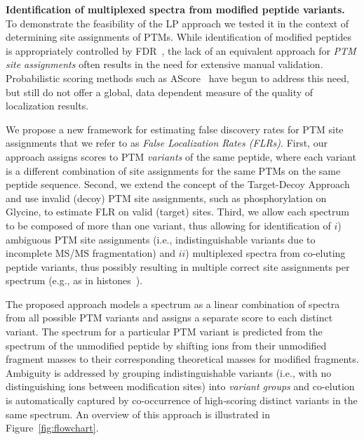 \documentclass[arial,11pt]{article}
\begin{document}
{\bf Identification of multiplexed spectra from modified peptide variants.} To demonstrate the feasibility of the LP approach we tested it in the context of determining site assignments of PTMs. While identification of modified peptides is appropriately controlled by FDR~\cite{beausoleil04,Trinidad2012}, the lack of an equivalent approach for {\em PTM site assignments} often results in the need for extensive manual validation. Probabilistic scoring methods such as AScore~\cite{beausoleil06} have begun to address this need, but still do not offer a global, data dependent measure of the quality of localization results. %

We propose a new framework for estimating  false discovery rates for PTM site assignments that we refer to as  {\em False Localization Rates (FLRs)}.   First, our approach assigns scores to PTM {\em variants} of the same peptide, where each variant is a different combination of site assignments for the same PTMs on the same peptide sequence. Second, we extend the concept of the Target-Decoy Approach~\cite{Elias2007}
and use invalid (decoy) PTM site assignments, such as phosphorylation on Glycine, to estimate FLR on valid (target) sites. Third, we allow each spectrum to be composed of more than one variant, thus allowing for identification of  $i$) ambiguous PTM site assignments (i.e., indistinguishable variants due to incomplete MS/MS fragmentation) and $ii$) multiplexed spectra from co-eluting peptide variants, %
thus possibly resulting in multiple correct site assignments per spectrum (e.g., as in histones~\cite{DiMaggio2009}).

The proposed approach models a spectrum as a linear combination of spectra from all possible PTM variants and assigns a separate score to each distinct variant. The spectrum for a particular PTM variant is predicted from the spectrum of the unmodified peptide by shifting ions from their unmodified fragment masses to their corresponding theoretical masses for modified fragments.  Ambiguity is addressed by grouping indistinguishable variants (i.e., with no distinguishing ions between modification sites) into {\em variant groups} and co-elution is automatically captured by co-occurrence of high-scoring distinct variants in the same  spectrum. An overview of this approach is illustrated in Figure~\ref{fig:flowchart}.
\end{document}
